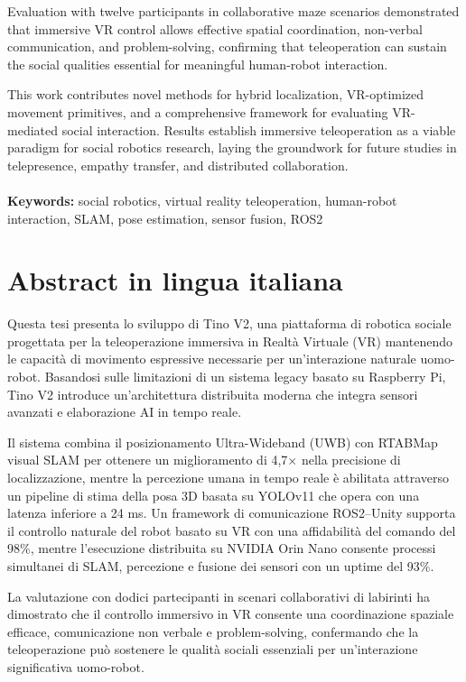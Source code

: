 \documentclass{Configuration_Files/PoliMi3i_thesis}
\begin{document}
Evaluation with twelve participants in collaborative maze scenarios demonstrated that immersive VR control allows effective spatial coordination, non-verbal communication, and problem-solving, confirming that teleoperation can sustain the social qualities essential for meaningful human-robot interaction.

This work contributes novel methods for hybrid localization, VR-optimized movement primitives, and a comprehensive framework for evaluating VR-mediated social interaction. Results establish immersive teleoperation as a viable paradigm for social robotics research, laying the groundwork for future studies in telepresence, empathy transfer, and distributed collaboration.\\
\\
\textbf{Keywords:} social robotics, virtual reality teleoperation, human-robot interaction, SLAM, pose estimation, sensor fusion, ROS2%

\chapter*{Abstract in lingua italiana}
Questa tesi presenta lo sviluppo di Tino V2, una piattaforma di robotica sociale progettata per la teleoperazione immersiva in Realtà Virtuale (VR) mantenendo le capacità di movimento espressive necessarie per un'interazione naturale uomo-robot. Basandosi sulle limitazioni di un sistema legacy basato su Raspberry Pi, Tino V2 introduce un'architettura distribuita moderna che integra sensori avanzati e elaborazione AI in tempo reale.

Il sistema combina il posizionamento Ultra-Wideband (UWB) con RTABMap visual SLAM per ottenere un miglioramento di 4,7× nella precisione di localizzazione, mentre la percezione umana in tempo reale è abilitata attraverso un pipeline di stima della posa 3D basata su YOLOv11 che opera con una latenza inferiore a 24 ms. Un framework di comunicazione ROS2–Unity supporta il controllo naturale del robot basato su VR con una affidabilità del comando del 98\%, mentre l'esecuzione distribuita su NVIDIA Orin Nano consente processi simultanei di SLAM, percezione e fusione dei sensori con un uptime del 93\%.

La valutazione con dodici partecipanti in scenari collaborativi di labirinti ha dimostrato che il controllo immersivo in VR consente una coordinazione spaziale efficace, comunicazione non verbale e problem-solving, confermando che la teleoperazione può sostenere le qualità sociali essenziali per un'interazione significativa uomo-robot.
\end{document}
